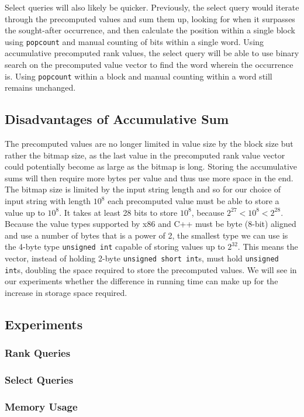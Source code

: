 Select queries will also likely be quicker.
Previously, the select query would iterate through the precomputed values and sum them up, looking for when it surpasses the sought-after occurrence, and then calculate the position within a single block using \texttt{popcount} and manual counting of bits within a single word.
Using accumulative precomputed rank values, the select query will be able to use binary search on the precomputed value vector to find the word wherein the occurrence is.
Using \texttt{popcount} within a block and manual counting within a word still remains unchanged.

\subsection{Disadvantages of Accumulative Sum}
The precomputed values are no longer limited in value size by the block size but rather the bitmap size, as the last value in the precomputed rank value vector could potentially become as large as the bitmap is long.
Storing the accumulative sums will then require more bytes per value and thus use more space in the end.
The bitmap size is limited by the input string length and so for our choice of input string with length $10^8$ each precomputed value must be able to store a value up to $10^8$.
It takes at least 28 bits to store $10^8$, because $2^{27} < 10^8 < 2^{28}$.
Because the value types supported by x86 and C++ must be byte (8-bit) aligned and use a number of bytes that is a power of 2, the smallest type we can use is the 4-byte type \texttt{unsigned int} capable of storing values up to $2^{32}$.
This means the vector, instead of holding 2-byte \texttt{unsigned short int}s, must hold \texttt{unsigned int}s, doubling the space required to store the precomputed values.
We will see in our experiments whether the difference in running time can make up for the increase in storage space required.


\subsection{Experiments}

\subsubsection{Rank Queries}

\subsubsection{Select Queries}

\subsubsection{Memory Usage}
